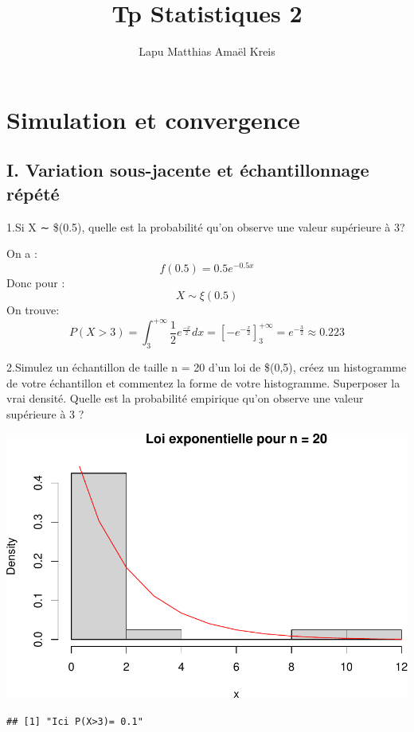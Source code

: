 \documentclass[
]{article}
\title{Tp Statistiques 2}
\author{Lapu Matthias \textbar{} Amaël Kreis}
\date{}
\begin{document}
\maketitle

\hypertarget{simulation-et-convergence}{%
\section{Simulation et convergence}\label{simulation-et-convergence}}

\hypertarget{i.-variation-sous-jacente-et-uxe9chantillonnage-ruxe9puxe9tuxe9}{%
\subsection{I. Variation sous-jacente et échantillonnage
répété}\label{i.-variation-sous-jacente-et-uxe9chantillonnage-ruxe9puxe9tuxe9}}

1.Si X ∼ \$\epsilon(0.5), quelle est la probabilité qu'on observe une
valeur supérieure à 3?

On a : \[ 
f(0.5) = 0.5e^{-0.5x} 
\] Donc pour : \[ 
X\sim\xi(0.5) 
\] On trouve: \[
P(X > 3)=
\int_{3}^{+\infty} \frac{1}{2}e^{\frac{-x}{2}}dx
= \left[-e^{-\frac{x}{2}}\right]_3^{+\infty}
=e^{-\frac{3}{2}}\approx0.223
\]

2.Simulez un échantillon de taille n = 20 d'un loi de \$\epsilon(0,5),
créez un histogramme de votre échantillon et commentez la forme de votre
histogramme. Superposer la vrai densité. Quelle est la probabilité
empirique qu'on observe une valeur supérieure à 3 ?

\includegraphics{tp2_files/figure-latex/q2-1.pdf}

\begin{verbatim}
## [1] "Ici P(X>3)= 0.1"
\end{verbatim}
\end{document}
